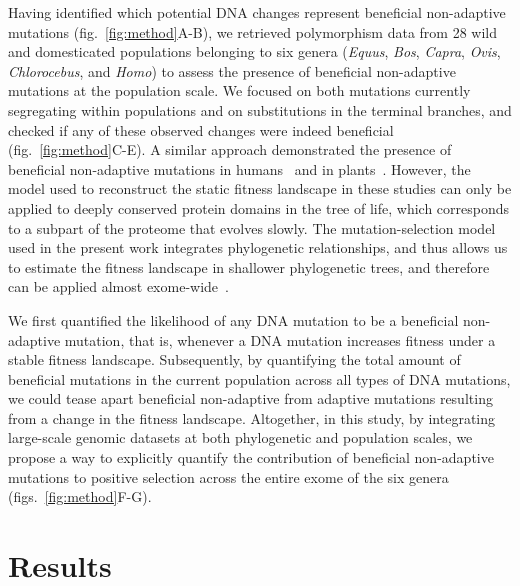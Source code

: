 \documentclass{article}
\begin{document}
    Having identified which potential DNA changes represent beneficial non-adaptive mutations (fig.~\ref{fig:method}A-B), we retrieved polymorphism data from 28 wild and domesticated populations belonging to six genera (\textit{Equus}, \textit{Bos}, \textit{Capra}, \textit{Ovis}, \textit{Chlorocebus}, and \textit{Homo}) to assess the presence of beneficial non-adaptive mutations at the population scale.
    We focused on both mutations currently segregating within populations and on substitutions in the terminal branches, and checked if any of these observed changes were indeed beneficial (fig.~\ref{fig:method}C-E).
    A similar approach demonstrated the presence of beneficial non-adaptive mutations in humans~\cite{moses_inferring_2009, fischer_germline_2011} and in plants~\cite{chen_hunting_2021}.
    However, the model used to reconstruct the static fitness landscape in these studies can only be applied to deeply conserved protein domains in the tree of life, which corresponds to a subpart of the proteome that evolves slowly.
    The mutation-selection model used in the present work integrates phylogenetic relationships, and thus allows us to estimate the fitness landscape in shallower phylogenetic trees, and therefore can be applied almost exome-wide~\cite{rodrigue_mutationselection_2010}.

    We first quantified the likelihood of any DNA mutation to be a beneficial non-adaptive mutation, that is, whenever a DNA mutation increases fitness under a stable fitness landscape.
    Subsequently, by quantifying the total amount of beneficial mutations in the current population across all types of DNA mutations, we could tease apart beneficial non-adaptive from adaptive mutations resulting from a change in the fitness landscape.
    Altogether, in this study, by integrating large-scale genomic datasets at both phylogenetic and population scales, we propose a way to explicitly quantify the contribution of beneficial non-adaptive mutations to positive selection across the entire exome of the six genera (figs.~\ref{fig:method}F-G).

    \section*{Results}
\end{document}
